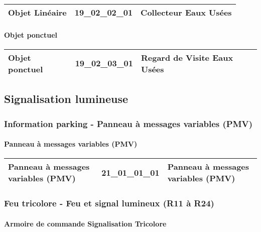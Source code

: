 \documentclass[12pt,titlepage]{book}
\begin{document}
\renewcommand{\arraystretch}{1.2}
\begin{supertabular}{|p{10cm}|c|p{15cm}|}
 Objet Linéaire & 19\_02\_02\_01 & Collecteur Eaux Usées\\
\hline
\end{supertabular}


\paragraph{Objet ponctuel}
\noindent
\vspace{\baselineskip}

\renewcommand{\arraystretch}{1.2}
\begin{supertabular}{|p{10cm}|c|p{15cm}|}
 Objet ponctuel & 19\_02\_03\_01 & Regard de Visite Eaux Usées\\
\hline
\end{supertabular}
\subsection{Signalisation lumineuse}
\subsubsection{\large Information parking - Panneau à messages variables (PMV)}
\paragraph{Panneau à messages variables (PMV)}
\noindent
\vspace{\baselineskip}

\renewcommand{\arraystretch}{1.2}
\begin{supertabular}{|p{10cm}|c|p{15cm}|}
 Panneau à messages variables (PMV) & 21\_01\_01\_01 & Panneau à messages variables (PMV)\\
\hline
\end{supertabular}

\subsubsection{\large Feu tricolore - Feu et signal lumineux (R11 à R24)}
\paragraph{Armoire de commande Signalisation Tricolore}
\noindent
\vspace{\baselineskip}
\end{document}
